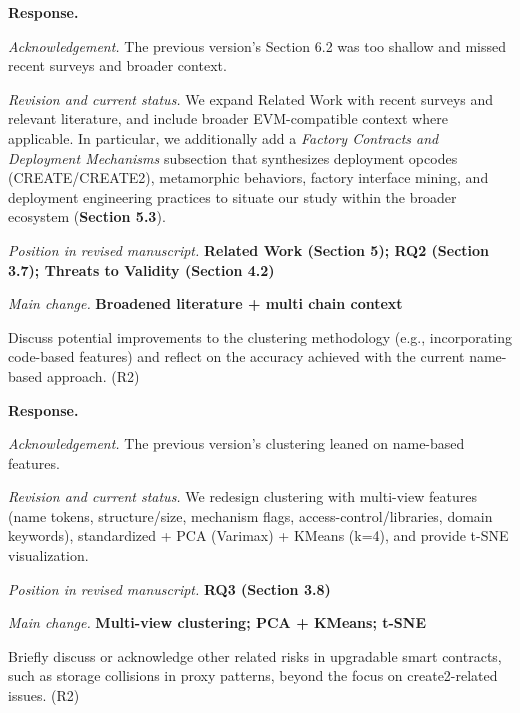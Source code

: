 \documentclass[acmsmall]{acmart}
\begin{document}
	\noindent
	\textbf{Response.}

	\textit{Acknowledgement.} The previous version’s Section 6.2 was too shallow and missed recent
	surveys and broader context.

	\textit{Revision and current status.} We expand Related Work with recent surveys and relevant literature,
	and include broader EVM-compatible context where applicable. In particular, we additionally add
	a \emph{Factory Contracts and Deployment Mechanisms} subsection that synthesizes deployment opcodes
	(CREATE/CREATE2), metamorphic behaviors, factory interface mining, and deployment engineering
	practices to situate our study within the broader ecosystem (\textbf{Section 5.3}).

	\vspace{0.25em}
	\textit{Position in revised manuscript.}
	{\color{red}\textbf{Related Work (Section 5); RQ2 (Section 3.7); Threats to Validity (Section 4.2)}}

	\textit{Main change.} {\color{blue}\textbf{Broadened literature + multi chain context}}

	\begin{tcolorbox}
		[commentbox,title=Editor/AE -- Comment 7.1] Discuss potential improvements to the clustering
		methodology (e.g., incorporating code-based features) and reflect on the accuracy achieved
		with the current name-based approach. (R2)
	\end{tcolorbox}

	\noindent
	\textbf{Response.}

	\textit{Acknowledgement.} The previous version’s clustering leaned on name-based features.

	\textit{Revision and current status.} We redesign clustering with multi-view features (name tokens,
	structure/size, mechanism flags, access-control/libraries, domain keywords), standardized + PCA (Varimax)
	+ KMeans (k=4), and provide t-SNE visualization.

	\textit{Position in revised manuscript.} {\color{red}\textbf{RQ3 (Section 3.8)}}

	\textit{Main change.} {\color{blue}\textbf{Multi-view clustering; PCA + KMeans; t-SNE}}

	\begin{tcolorbox}
		[commentbox,title=Editor/AE -- Comment 7.2] Briefly discuss or acknowledge other related
		risks in upgradable smart contracts, such as storage collisions in proxy patterns, beyond
		the focus on create2-related issues. (R2)
	\end{tcolorbox}
\end{document}
